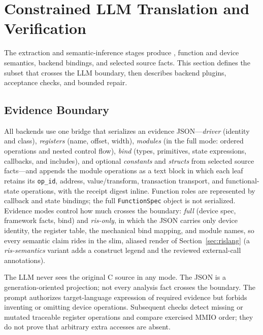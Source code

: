 
\section{Constrained LLM Translation and Verification}
\label{sec:generation}

The extraction and semantic-inference stages produce \rislang{}, function and
device semantics, backend bindings, and selected source facts. This section
defines the subset that crosses the LLM boundary, then describes backend
plugins, acceptance checks, and bounded repair.

\subsection{Evidence Boundary}
\label{sec:llm-bridge}

All backends use one bridge that serializes an evidence JSON---\emph{driver}
(identity and class), \emph{registers} (name, offset, width), \emph{modules}
(in the full mode: ordered operations and nested control flow), \emph{bind}
(types, primitives, state expressions, callbacks, and includes), and optional
\emph{constants} and \emph{structs} from selected source facts---and appends
the \rislang{} module operations as a text block in which each leaf retains
its \texttt{op\_id}, address, value/transform, transaction transport, and
functional-state operations, with the receipt digest inline. Function roles
are represented by callback and state bindings; the full
\texttt{FunctionSpec} object is not serialized. Evidence modes control how
much crosses the boundary: \emph{full} (device spec, framework facts, bind)
and \emph{ris-only}, in which the JSON carries only device identity, the
register table, the mechanical bind mapping, and module names, so every
semantic claim rides in the slim, aliased \rislang{} render of
Section~\ref{sec:rislang} (a \emph{ris-semantics} variant adds a construct
legend and the reviewed external-call annotations).

The LLM never sees the original C source in any mode. The JSON is a generation-oriented
projection; not every analysis fact crosses the boundary. The
prompt authorizes target-language expression of required evidence but forbids
inventing or omitting device operations. Subsequent checks detect missing or
mutated traceable register operations and compare exercised MMIO order; they
do not prove that arbitrary extra accesses are absent.

